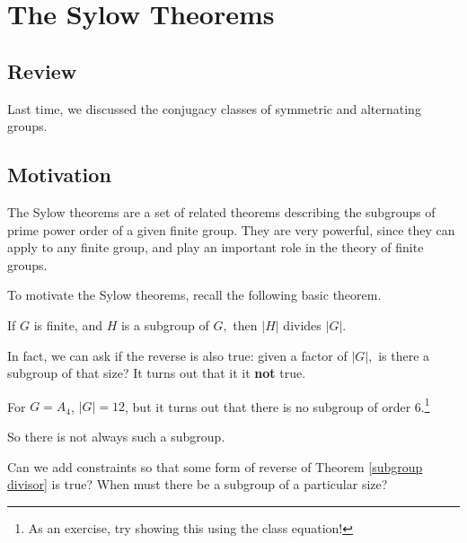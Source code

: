 
\section{The Sylow Theorems}

\subsection{Review}

Last time, we discussed the conjugacy classes of symmetric and alternating groups.



\subsection{Motivation}

The Sylow theorems are a set of related theorems describing the subgroups of prime power order of a given finite group. They are very powerful, since they can apply to any finite group, and play an important role in the theory of finite groups. 

To motivate the Sylow theorems, recall the following basic theorem. 

\begin{theorem}\label{subgroup divisor}
If $G$ is finite, and $H$ is a subgroup of $G,$ then $|H|$ divides $|G|.$ 
\end{theorem}

In fact, we can ask if the reverse is also true: given a factor of $|G|,$ is there a subgroup of that size? It turns out that it it \textbf{not} true. 

\begin{example}[Counterexample]
For $G = A_4$, $|G| = 12$, but it turns out that there is no subgroup of order 6.\footnote{As an exercise, try showing this using the class equation!}
\end{example}

So there is not always such a subgroup. 

\begin{qq}
Can we add constraints so that some form of reverse of Theorem \ref{subgroup divisor} is true? When must there be a subgroup of a particular size?
\end{qq}

